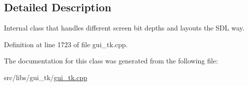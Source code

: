 \subsection{Detailed Description}
Internal class that handles different screen bit depths and layouts the S\-D\-L way. 

Definition at line 1723 of file gui\-\_\-tk.\-cpp.



The documentation for this class was generated from the following file\-:\begin{DoxyCompactItemize}
\item 
src/libs/gui\-\_\-tk/\hyperlink{gui__tk_8cpp}{gui\-\_\-tk.\-cpp}\end{DoxyCompactItemize}
